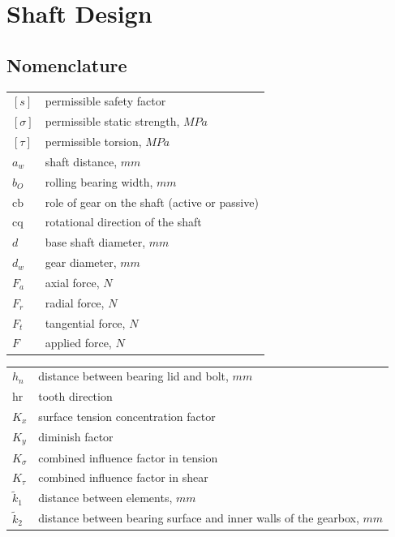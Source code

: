 \chapter{Shaft Design}
\section*{Nomenclature}
\begin{tabular}[t]{p{}p{}}
	$ [s] $ & permissible safety factor\\
	$ [\sigma] $ & permissible static strength, $ \unit{MPa} $\\
	$ [\tau] $ & permissible torsion, $ \unit{MPa} $\\
	$ a_w $ & shaft distance, $ \unit{mm} $\\
	$ b_O $ & rolling bearing width, $ \unit{mm}$\\
	$ \text{cb} $ & role of gear on the shaft (active or passive)\\
	$ \text{cq} $ & rotational direction of the shaft\\
	$ d $ & base shaft diameter, $ \unit{mm} $\\
	$ d_w $ & gear diameter, $ \unit{mm} $\\
	$ F_a $ & axial force, $ \unit{N} $\\
	$ F_r $ & radial force, $ \unit{N} $\\
	$ F_t $ & tangential force, $ \unit{N} $\\
	$ F $ & applied force, $ \unit{N} $\\	
\end{tabular}
\begin{tabular}[t]{p{}p{}}
	$ h_n $ & distance between bearing lid and bolt, $ \unit{mm} $\\
	$ \text{hr} $ & tooth direction\\
	$ K_x $ & surface tension concentration factor\\
	$ K_y $ & diminish factor\\
	$ K_\sigma $ & combined influence factor in tension\\
	$ K_\tau $ & combined influence factor in shear\\
	$ \tilde{k}_1 $ & distance between elements, $ \unit{mm} $\\
	$ \tilde{k}_2 $ & distance between bearing surface and inner walls of the gearbox, $ \unit{mm} $\\
\end{tabular}\newpage\noindent
